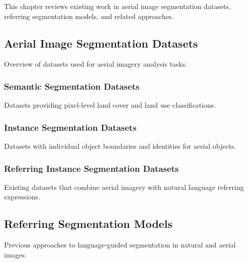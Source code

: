 \cleardoublepage
\label{chap:architecture}

This chapter reviews existing work in aerial image segmentation datasets, referring segmentation models, and related approaches.

\subsection{Aerial Image Segmentation Datasets}

Overview of datasets used for aerial imagery analysis tasks.

\subsubsection{Semantic Segmentation Datasets}

Datasets providing pixel-level land cover and land use classifications.

\subsubsection{Instance Segmentation Datasets}

Datasets with individual object boundaries and identities for aerial objects.

\subsubsection{Referring Instance Segmentation Datasets}

Existing datasets that combine aerial imagery with natural language referring expressions.

\subsection{Referring Segmentation Models}

Previous approaches to language-guided segmentation in natural and aerial images.

